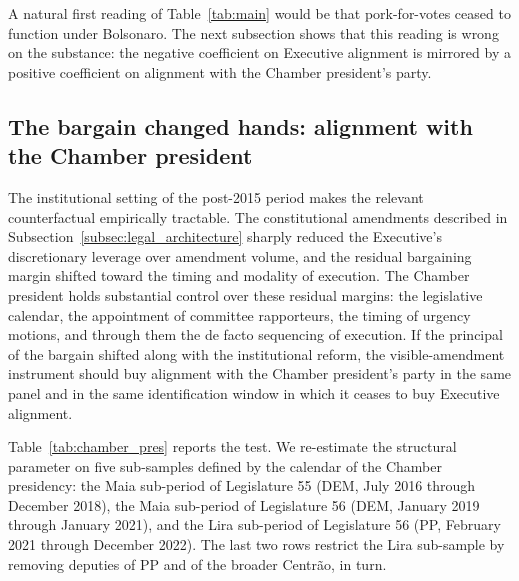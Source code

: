 \documentclass[preprint,12pt,authoryear]{elsarticle}
\begin{document}
A natural first reading of Table~\ref{tab:main} would be that pork-for-votes ceased to function under Bolsonaro. The next subsection shows that this reading is wrong on the substance: the negative coefficient on Executive alignment is mirrored by a positive coefficient on alignment with the Chamber president's party.

\subsection{The bargain changed hands: alignment with the Chamber president}
\label{subsec:legislative_capture}

The institutional setting of the post-2015 period makes the relevant counterfactual empirically tractable. The constitutional amendments described in Subsection~\ref{subsec:legal_architecture} sharply reduced the Executive's discretionary leverage over amendment volume, and the residual bargaining margin shifted toward the timing and modality of execution. The Chamber president holds substantial control over these residual margins: the legislative calendar, the appointment of committee rapporteurs, the timing of urgency motions, and through them the de facto sequencing of execution. If the principal of the bargain shifted along with the institutional reform, the visible-amendment instrument should buy alignment with the Chamber president's party in the same panel and in the same identification window in which it ceases to buy Executive alignment.

Table~\ref{tab:chamber_pres} reports the test. We re-estimate the structural parameter on five sub-samples defined by the calendar of the Chamber presidency: the Maia sub-period of Legislature 55 (DEM, July 2016 through December 2018), the Maia sub-period of Legislature 56 (DEM, January 2019 through January 2021), and the Lira sub-period of Legislature 56 (PP, February 2021 through December 2022). The last two rows restrict the Lira sub-sample by removing deputies of PP and of the broader Centr\~ao, in turn.
\end{document}
